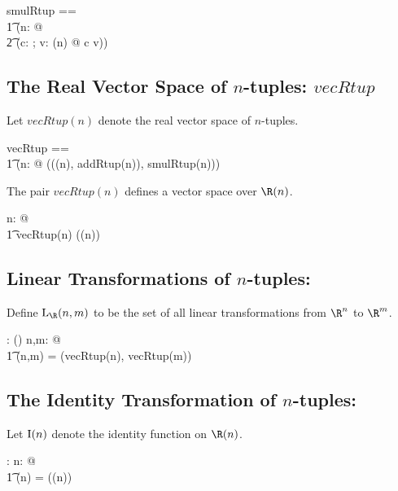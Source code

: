 \documentclass{amsart}
\begin{document}
\begin{zed}
smulRtup == \\
\t1	(\lambda n: \nat @ \\
\t2		(\lambda c: \R; v: \Rtup(n) @ c \smulRinf v))
\end{zed}

\subsection{The Real Vector Space of $n$-tuples: $vecRtup$}

Let $vecRtup(n)$ denote the real vector space of $n$-tuples.

\begin{zed}
vecRtup == \\
\t1	(\lambda n: \nat @ ((\Rtup(n), addRtup(n)), smulRtup(n)))
\end{zed}

\begin{remark}
The pair $vecRtup(n)$ defines a vector space over $\Rtup(n)$.

\begin{zed}
\forall n: \nat @ \\
\t1	vecRtup(n) \in \vecR(\Rtup(n))
\end{zed}

\end{remark}

\subsection{Linear Transformations of $n$-tuples: }

Define $\linRtup(n,m)$ to be the set of all linear transformations from $\R^n$ to $\R^m$.
\begin{axdef}
	\linRtup: \nat \cross \nat \fun \power(\Rinf \pfun \Rinf)
\where
	\forall n,m: \nat @ \\
	\t1	\linRtup(n,m) = \homVecR(vecRtup(n), vecRtup(m))
\end{axdef}

\subsection{The Identity Transformation of $n$-tuples: }

Let $\operatorname{I}(n)$ denote the identity function on $\Rtup(n)$.

\begin{axdef}
	\idRtup: \nat \fun \Rinf \pfun \Rinf
\where
	\forall n: \nat @ \\
	\t1	\idRtup(n) = \id(\Rtup(n))
\end{axdef}
\end{document}
